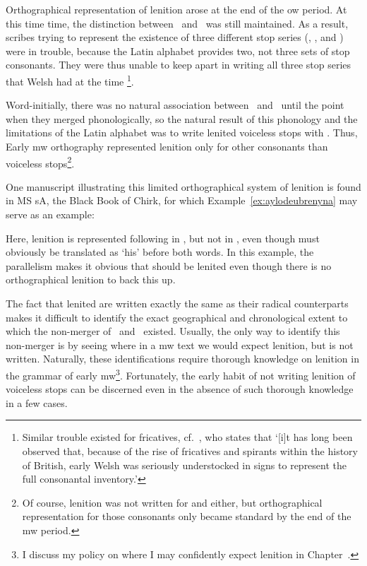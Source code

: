 Orthographical representation of lenition arose at the end of the \gls{ow} period. At this time time, the distinction between \lT\ and \xD\ was still maintained. As a result, scribes trying to represent the existence of three different stop series (\xT, \lT, and \xD) were in trouble, because the Latin alphabet  provides two, not three sets of stop consonants. They were thus unable to keep apart in writing all three stop series that Welsh had at the time%
\footnote{Similar trouble existed for fricatives, cf.\ \textcite[28]{russell_rowynniauc_2003}, who states that `[i]t has long been observed that, because of the rise of fricatives and spirants within the history of British, early Welsh was seriously understocked in signs to represent the full consonantal inventory.'}.

Word-initially, there was no natural association between \lT\ and \xD\ until the point when they merged phonologically, so the natural result of this phonology and the limitations of the Latin alphabet was to write lenited voiceless stops with . Thus, Early \gls{mw} orthography represented lenition only for other consonants than voiceless stops\footnote{Of course, lenition was not written for  and  either, but orthographical representation for those consonants only became standard by the end of the \gls{mw} period.}.


One manuscript illustrating this limited orthographical system of lenition is found in MS \gls{sA}, the Black Book of Chirk, for which Example~\ref{ex:aylodeubrenyna} may serve as an example: 


Here, lenition is represented following   in , but not in , even though  must obviously be translated as `his' before both words. In this example, the parallelism makes it obvious that  should be lenited even though there is no orthographical lenition to back this up.

The fact that lenited  are written exactly the same as their radical counterparts makes it difficult to identify the exact geographical and chronological extent to which the non-merger of \xD\ and \lT\ existed. Usually, the only way to identify this non-merger is by seeing where in a \gls{mw} text we would expect lenition, but is not written. Naturally, these identifications require thorough knowledge on lenition in  the grammar of early \gls{mw}\footnote{I discuss my policy on where I may confidently expect lenition in Chapter~.}. Fortunately, the early habit of not writing lenition of voiceless stops can be discerned even in the absence of such thorough knowledge in a few cases.

